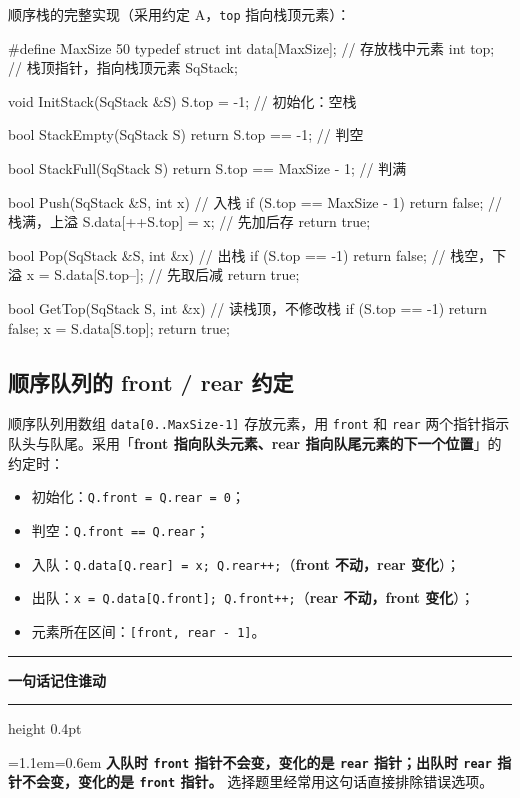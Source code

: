 \documentclass[11pt,openany,UTF8]{ctexbook}
\newcommand{\callouthead}[2]{%
  \par\addvspace{7pt}\noindent
  {\color{#1}\rule[-0.15em]{3pt}{1.05em}}\hspace{0.5em}%
  {\bfseries\color{#1}#2}\par\nobreak\vspace{-0.35em}%
  {\color{rulesep}\hrule height 0.4pt}\nobreak\vspace{0.45em}%
  \begingroup\small\setlength{\parindent}{0pt}%
  \leftskip=1.1em\rightskip=0.6em\noindent\ignorespaces}
\newcommand{\calloutend}{\par\endgroup\addvspace{7pt}}
\newenvironment{callkey}[1]{\callouthead{keybar}{#1}}{\calloutend}
\begin{document}
顺序栈的完整实现（采用约定 A，\texttt{top} 指向栈顶元素）：

\begin{codebox}
#define MaxSize 50
typedef struct {
    int data[MaxSize];   // 存放栈中元素
    int top;             // 栈顶指针，指向栈顶元素
} SqStack;

void InitStack(SqStack &S) { S.top = -1; }              // 初始化：空栈

bool StackEmpty(SqStack S) { return S.top == -1; }      // 判空

bool StackFull(SqStack S) { return S.top == MaxSize - 1; }   // 判满

bool Push(SqStack &S, int x) {                          // 入栈
    if (S.top == MaxSize - 1) return false;             // 栈满，上溢
    S.data[++S.top] = x;                                // 先加后存
    return true;
}

bool Pop(SqStack &S, int &x) {                          // 出栈
    if (S.top == -1) return false;                      // 栈空，下溢
    x = S.data[S.top--];                                // 先取后减
    return true;
}

bool GetTop(SqStack S, int &x) {                        // 读栈顶，不修改栈
    if (S.top == -1) return false;
    x = S.data[S.top];
    return true;
}
\end{codebox}

\subsection{顺序队列的 front / rear 约定}

顺序队列用数组 \texttt{data[0..MaxSize-1]\allowbreak{}} 存放元素，用 \texttt{front} 和 \texttt{rear} 两个指针指示队头与队尾。采用「\textbf{front 指向队头元素、rear 指向队尾元素的下一个位置}」的约定时：

\begin{itemize}
\item 初始化：\texttt{Q.front =\allowbreak{} Q.rear =\allowbreak{} 0}；
\item 判空：\texttt{Q.front =\allowbreak{}=\allowbreak{} Q.rear}；
\item 入队：\texttt{Q.data[Q.rear]\allowbreak{} =\allowbreak{} x;\allowbreak{} Q.rear+\allowbreak{}+\allowbreak{};\allowbreak{}}（\textbf{front 不动，rear 变化}）；
\item 出队：\texttt{x =\allowbreak{} Q.data[Q.front]\allowbreak{};\allowbreak{} Q.front+\allowbreak{}+\allowbreak{};\allowbreak{}}（\textbf{rear 不动，front 变化}）；
\item 元素所在区间：\texttt{[front,\allowbreak{} rear - 1]\allowbreak{}}。
\end{itemize}
\begin{callkey}{一句话记住谁动}
\textbf{入队时 \texttt{front} 指针不会变，变化的是 \texttt{rear} 指针；出队时 \texttt{rear} 指针不会变，变化的是 \texttt{front} 指针。} 选择题里经常用这句话直接排除错误选项。

\end{callkey}
\end{document}
